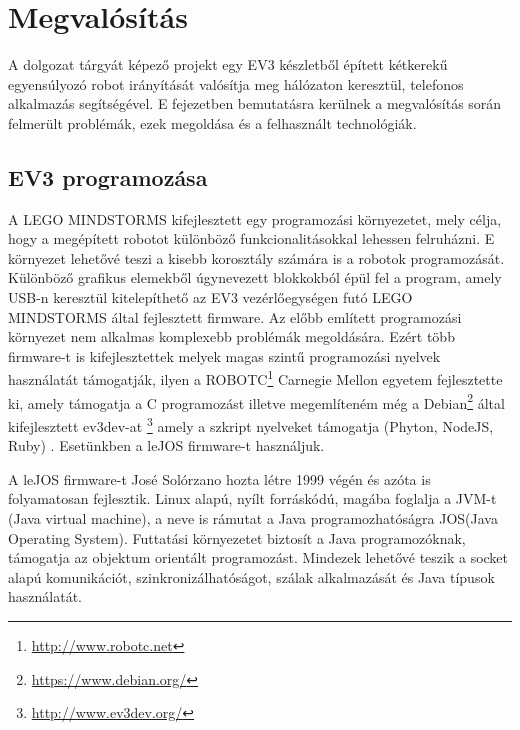 \chapter{Megvalósítás}\label{ch:MEGVALOSITAS}
\begin{osszefoglal}
	A dolgozat tárgyát képező projekt egy EV3 készletből épített kétkerekű egyensúlyozó robot irányítását valósítja meg hálózaton keresztül, telefonos alkalmazás segítségével. E fejezetben bemutatásra kerülnek a megvalósítás során felmerült problémák, ezek megoldása és a felhasznált technológiák.
\end{osszefoglal}

\section{EV3 programozása}\label{sec:MEGVALOSITAS:lejos}
A LEGO MINDSTORMS kifejlesztett egy programozási környezetet, mely célja, hogy a megépített robotot különböző funkcionalitásokkal lehessen felruházni. E környezet lehetővé teszi a kisebb korosztály számára is a robotok programozását. Különböző grafikus elemekből úgynevezett blokkokból épül fel a program, amely USB-n keresztül kitelepíthető az EV3 vezérlőegységen futó LEGO MINDSTORMS által fejlesztett firmware.
Az előbb említett programozási környezet nem alkalmas komplexebb problémák megoldására. Ezért több firmware-t is kifejlesztettek melyek magas szintű programozási nyelvek használatát támogatják, ilyen a ROBOTC\footnote{\href {http://www.robotc.net}{http://www.robotc.net}} Carnegie Mellon egyetem fejlesztette ki, amely támogatja a C programozást illetve megemlíteném még a Debian\footnote{\href{https://www.debian.org/}{https://www.debian.org/}} által kifejlesztett ev3dev-at \footnote{\href{http://www.ev3dev.org/}{http://www.ev3dev.org/}} amely a szkript nyelveket támogatja (Phyton, NodeJS, Ruby) . Esetünkben a leJOS firmware-t használjuk.

A leJOS firmware-t José Solórzano hozta létre 1999 végén és azóta is folyamatosan fejlesztik. Linux alapú, nyílt forráskódú, magába foglalja a JVM-t (Java virtual machine), a neve is rámutat a Java programozhatóságra JOS(Java Operating System). Futtatási környezetet biztosít a Java programozóknak, támogatja az objektum orientált programozást. Mindezek lehetővé teszik a socket alapú komunikációt, szinkronizálhatóságot, szálak alkalmazását és Java típusok használatát.
 
